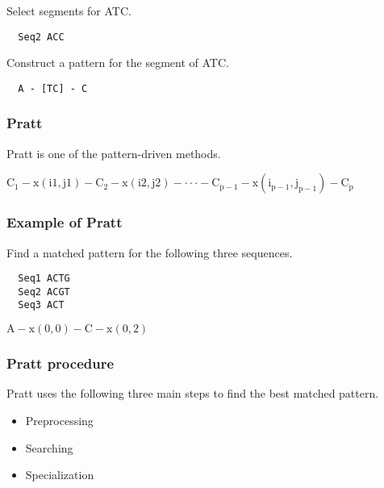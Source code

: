 \noindent
Select segments for ATC.
\begin{verbatim}
  Seq2 ACC
\end{verbatim}

\noindent
Construct a pattern for the segment of ATC.
\begin{verbatim}
  A - [TC] - C
\end{verbatim}

%
%
\subsubsection*{Pratt}
Pratt is one of the pattern-driven methods. 

$\mathrm{C_1 
-  x(i1, j1) 
-  C_2 
- x(i2, j2) 
-   \cdot\cdot\cdot 
-  C_{p-1} 
-   x(i_{p - 1}, j_{p -1})
-   C_p}$

%
%
\subsubsection*{Example of Pratt}
Find a matched pattern for the following three sequences.
\begin{verbatim}
  Seq1 ACTG
  Seq2 ACGT
  Seq3 ACT
\end{verbatim}

$\mathrm{A - x(0,0) - C - x(0,2)}$

%
%
\subsubsection*{Pratt procedure}
Pratt uses the following three main steps to find the best matched pattern.

\begin{itemize}
\item Preprocessing
\item Searching
\item Specialization
\end{itemize}

\bigskip 

%
